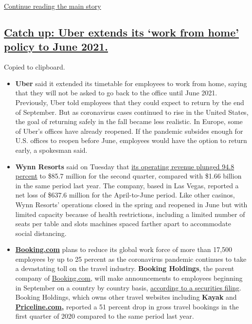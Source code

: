 \protect\hyperlink{after-dfp-ad-mid3}{Continue reading the main story}

\hypertarget{catch-up-uber-extends-its-work-from-home-policy-to-june-2021}{%
\subsection{\texorpdfstring{\protect\hyperlink{catch-up-uber-extends-its-work-from-home-policy-to-june-2021}{Catch
up: Uber extends its `work from home' policy to June
2021.}}{Catch up: Uber extends its `work from home' policy to June 2021.}}\label{catch-up-uber-extends-its-work-from-home-policy-to-june-2021}}

Copied to clipboard.

\begin{itemize}
\item
  \textbf{Uber} said it extended its timetable for employees to work
  from home, saying that they will not be asked to go back to the office
  until June 2021. Previously, Uber told employees that they could
  expect to return by the end of September. But as coronavirus cases
  continued to rise in the United States, the goal of returning safely
  in the fall became less realistic. In Europe, some of Uber's offices
  have already reopened. If the pandemic subsides enough for U.S.
  offices to reopen before June, employees would have the option to
  return early, a spokesman said.
\item
  \textbf{Wynn Resorts} said on Tuesday that
  \href{https://wynnresortslimited.gcs-web.com/news-releases/news-release-details/wynn-resorts-limited-reports-second-quarter-2020-results?field_nir_news_date_value\%5Bmin\%5D=}{its
  operating revenue plunged 94.8 percent} to \$85.7 million for the
  second quarter, compared with \$1.66 billion in the same period last
  year. The company, based in Las Vegas, reported a net loss of \$637.6
  million for the April-to-June period. Like other casinos, Wynn
  Resorts' operations closed in the spring and reopened in June but with
  limited capacity because of health restrictions, including a limited
  number of seats per table and slots machines spaced farther apart to
  accommodate social distancing.
\item
  \textbf{\href{http://booking.com/}{Booking.com}} plans to reduce its
  global work force of more than 17,500 employees by up to 25 percent as
  the coronavirus pandemic continues to take a devastating toll on the
  travel industry. \textbf{Booking Holdings}, the parent company of
  \href{http://booking.com/}{Booking.com}, will make announcements to
  employees beginning in September on a country by country basis,
  \href{https://www.sec.gov/ix?doc=/Archives/edgar/data/1075531/000107553120000042/bkng-20200804.htm}{according
  to a securities filing}. Booking Holdings, which owns other travel
  websites including \textbf{Kayak} and
  \textbf{\href{http://priceline.com/}{Priceline.com},} reported a 51
  percent drop in gross travel bookings in the first quarter of 2020
  compared to the same period last year.
\end{itemize}

